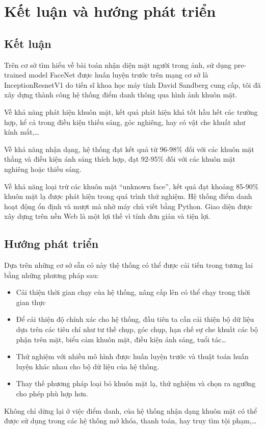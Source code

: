\chapter{Kết luận và hướng phát triển}
\label{cha:chap4}

\section{Kết luận}
Trên cơ sở tìm hiểu về bài toán nhận diện mặt người trong ảnh, sử dụng pre-trained
model FaceNet được huấn luyện trước trên mạng cơ sở là InceptionResnetV1 do
tiến sĩ khoa học máy tính David Sandberg cung cấp, tôi đã xây dựng thành công hệ
thống điểm danh thông qua hình ảnh khuôn mặt.

Về khả năng phát hiện khuôn mặt, kết quả phát hiện khá tốt hầu hết các trường hợp,
kể cả trong điều kiện thiếu sáng, góc nghiêng, hay có vật che khuất như kính mắt,…

Về khả năng nhận dạng, hệ thống đạt kết quả từ 96-98\% đối với các khuôn mặt thẳng
và điều kiện ánh sáng thích hợp, đạt 92-95\% đối với các khuôn mặt nghiêng hoặc
thiếu sáng.

Về khả năng loại trừ các khuôn mặt “unknown face”, kết quả đạt khoảng 85-90\% khuôn mặt lạ
được phát hiện trong quá trình thử nghiệm.
Hệ thống điểm danh hoạt động ổn định và mượt mà nhờ máy chủ viết bằng Python.
Giao diện được xây dựng trên nền Web là một lợi thế vì tính đơn giản và tiện lợi.

\section{Hướng phát triển}

Dựa trên những cơ sở sẵn có này thệ thống có thể được cải tiến trong
tương lai bằng những phương pháp sau:
\begin{itemize}
    \item Cải thiện thời gian chạy của hệ thống, nâng cấp lên có thể chạy trong thời gian thực
    \item Để cải thiện độ chính xác cho hệ thống, đầu tiên ta cần cải thiện bộ dữ liệu dựa trên các tiêu chí như tư thế chụp, góc chụp, hạn chế sự che khuất các bộ phận trên mặt, biểu cảm khuôn mặt, điều kiện ánh sáng, tuổi tác…
    \item Thử nghiệm với nhiều mô hình được huấn luyện trước và thuật toán huấn luyện khác nhau cho bộ dữ liệu của hệ thống.
    \item Thay thế phương pháp loại bỏ khuôn mặt lạ, thử nghiệm và chọn ra ngưỡng cho phép phù hợp hơn.
\end{itemize}

Không chỉ dừng lại ở việc điểm danh, của hệ thống nhận dạng khuôn mặt có thể được sử dụng trong các 
hệ thống mở khóa, thanh toán, hay truy tìm tội phạm,…



